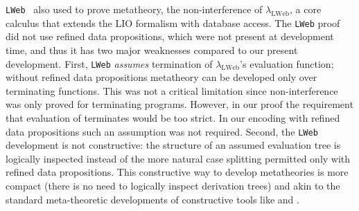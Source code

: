 \texttt{LWeb}~\cite{lweb} also used \lh 
to prove metatheory, %
the non-interference of $\lambda_{\text{LWeb}}$,
a core calculus that extends the LIO formalism with database access. 
The \texttt{LWeb} proof did not use refined data propositions, 
which were not present at development time,
and thus it has two major weaknesses compared to our 
present development. 
First, \texttt{LWeb}
\textit{assumes} termination of $\lambda_{\text{LWeb}}$'s evaluation function; 
without refined data propositions metatheory can be developed only over 
terminating functions. 
This was not a critical limitation since non-interference was only 
proved for terminating programs. 
However, in our proof the requirement that evaluation of \sysrf terminates 
would be too strict. 
In our encoding with refined data propositions
such an assumption was not required. 
Second, the \texttt{LWeb} development is not constructive: 
the structure of an assumed evaluation tree is logically inspected 
instead of the more natural case splitting permitted only with 
refined data propositions. 
This constructive way to develop metatheories is more compact 
(\eg there is no need to logically inspect 
derivation trees) and akin to the standard 
meta-theoretic developments of constructive tools like 
\coq and \isabelle. 
